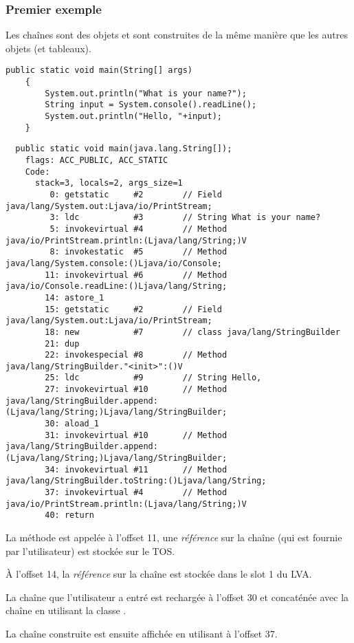 \subsubsection{Premier exemple}

Les chaînes sont des objets et sont construites de la même manière que les autres
objets (et tableaux).


\begin{lstlisting}[style=customjava]
	public static void main(String[] args)
	{
		System.out.println("What is your name?");
		String input = System.console().readLine();
		System.out.println("Hello, "+input);
	}
\end{lstlisting}

\begin{lstlisting}
  public static void main(java.lang.String[]);
    flags: ACC_PUBLIC, ACC_STATIC
    Code:
      stack=3, locals=2, args_size=1
         0: getstatic     #2        // Field java/lang/System.out:Ljava/io/PrintStream;
         3: ldc           #3        // String What is your name?
         5: invokevirtual #4        // Method java/io/PrintStream.println:(Ljava/lang/String;)V
         8: invokestatic  #5        // Method java/lang/System.console:()Ljava/io/Console;
        11: invokevirtual #6        // Method java/io/Console.readLine:()Ljava/lang/String;
        14: astore_1      
        15: getstatic     #2        // Field java/lang/System.out:Ljava/io/PrintStream;
        18: new           #7        // class java/lang/StringBuilder
        21: dup           
        22: invokespecial #8        // Method java/lang/StringBuilder."<init>":()V
        25: ldc           #9        // String Hello, 
        27: invokevirtual #10       // Method java/lang/StringBuilder.append:(Ljava/lang/String;)Ljava/lang/StringBuilder;
        30: aload_1       
        31: invokevirtual #10       // Method java/lang/StringBuilder.append:(Ljava/lang/String;)Ljava/lang/StringBuilder;
        34: invokevirtual #11       // Method java/lang/StringBuilder.toString:()Ljava/lang/String;
        37: invokevirtual #4        // Method java/io/PrintStream.println:(Ljava/lang/String;)V
        40: return        
\end{lstlisting}

La méthode  est appelée à l'offset 11, une \emph{référence} sur la
chaîne (qui est fournie par l'utilisateur) est stockée sur le \ac{TOS}.

À l'offset 14, la \emph{référence} sur la chaîne est stockée dans le slot 1 du \ac{LVA}.

La chaîne que l'utilisateur a entré est rechargée à l'offset 30 et concaténée avec
la chaîne  en utilisant la classe .

La chaîne construite est ensuite affichée en utilisant  à l'offset
37.

